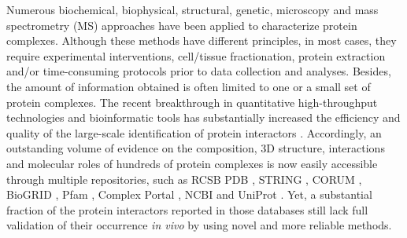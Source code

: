 Numerous biochemical, biophysical, structural, genetic, microscopy and mass spectrometry (MS) approaches have been applied to characterize protein complexes. Although these methods have different principles, in most cases, they require experimental interventions, cell/tissue fractionation, protein extraction and/or time-consuming protocols prior to data collection and analyses. Besides, the amount of information obtained is often limited to one or a small set of protein complexes. The recent breakthrough in quantitative high-throughput technologies and bioinformatic tools has substantially increased the efficiency and quality of the large-scale identification of protein interactors \cite{Iacobucci_2021, Low_2021}. Accordingly, an outstanding volume of evidence on the composition, 3D structure, interactions and molecular roles of hundreds of protein complexes is now easily accessible through multiple repositories, such as RCSB PDB \cite{Burley_2021}, STRING \cite{Szklarczyk_2021}, CORUM \cite{Giurgiu_2019}, BioGRID \cite{Oughtred_2021}, Pfam \cite{Mistry_2021}, Complex Portal \cite{Meldal_2021}, NCBI \cite{Coordinators_2016} and UniProt \cite{UniProt_2021}. Yet, a substantial fraction of the protein interactors reported in those databases still lack full validation of their occurrence \emph{in vivo} by using novel and more reliable methods.


